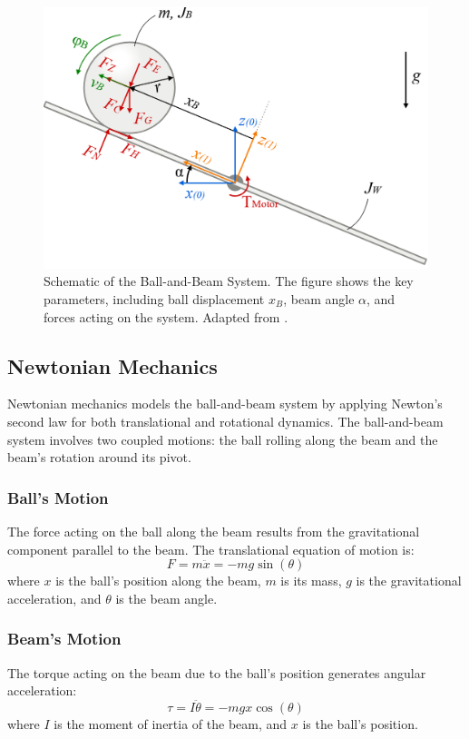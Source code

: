 \documentclass[conference]{IEEEtran}
\begin{document}
\begin{figure}[htbp]
    \centering
    \includegraphics[width=\linewidth]{Figures/system_diag_wiki_right.PNG}
    \caption{Schematic of the Ball-and-Beam System. The figure shows the key parameters, including ball displacement \(x_B\), beam angle \(\alpha\), and forces acting on the system. Adapted from \cite{mager2015}.}
    \label{fig:ball_beam_schematic}
\end{figure}


\subsection{Newtonian Mechanics}
\label{subsec:model_newtonian}
Newtonian mechanics models the ball-and-beam system by applying Newton's second law for both translational and rotational dynamics. The ball-and-beam system involves two coupled motions: the ball rolling along the beam and the beam's rotation around its pivot.

\subsubsection{Ball's Motion}
\label{subsubsec:model_newt_ball}
The force acting on the ball along the beam results from the gravitational component parallel to the beam. The translational equation of motion is:
\begin{equation}
F = m \ddot{x} = -m g \sin(\theta)
\end{equation}
where \(x\) is the ball's position along the beam, \(m\) is its mass, \(g\) is the gravitational acceleration, and \(\theta\) is the beam angle.

\subsubsection{Beam's Motion}
\label{subsubsec:model_newt_beam}
The torque acting on the beam due to the ball's position generates angular acceleration:
\begin{equation}
\tau = I \ddot{\theta} = -m g x \cos(\theta)
\end{equation}
where \(I\) is the moment of inertia of the beam, and \(x\) is the ball's position. 
\end{document}
